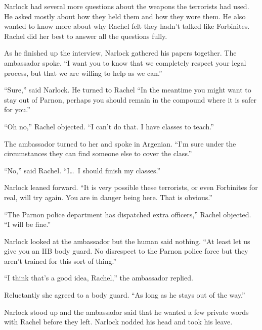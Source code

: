 Narlock had several more questions about the weapons the terrorists had used. He asked mostly
about how they held them and how they wore them. He also wanted to know more about why Rachel
felt they hadn't talked like Forbinites. Rachel did her best to answer all the questions fully.

As he finished up the interview, Narlock gathered his papers together. The ambassador spoke. ``I
want you to know that we completely respect your legal process, but that we are willing to help
as we can.''

``Sure,'' said Narlock. He turned to Rachel ``In the meantime you might want to stay out of
Parnon, perhaps you should remain in the compound where it is safer for you.''

``Oh no,'' Rachel objected. ``I can't do that. I have classes to teach.''

The ambassador turned to her and spoke in Argenian. ``I'm sure under the circumstances they can
find someone else to cover the class.''

``No,'' said Rachel. ``I\ldots\ I should finish my classes.''

Narlock leaned forward. ``It is very possible these terrorists, or even Forbinites for real, will
try again. You are in danger being here. That is obvious.''

``The Parnon police department has dispatched extra officers,'' Rachel objected. ``I will be
fine.''

Narlock looked at the ambassador but the human said nothing. ``At least let us give you an IIB
body guard. No disrespect to the Parnon police force but they aren't trained for this sort of
thing.''

``I think that's a good idea, Rachel,'' the ambassador replied.

Reluctantly she agreed to a body guard. ``As long as he stays out of the way.''

Narlock stood up and the ambassador said that he wanted a few private words with Rachel before
they left. Narlock nodded his head and took his leave.
